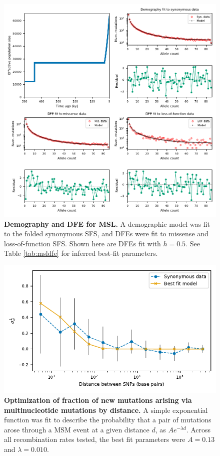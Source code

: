 \documentclass[]{article}
\begin{document}
\begin{figure}[ht!]
    \centering
    \includegraphics{../figures/msl_demography_dfes}
    \caption{
        \textbf{Demography and DFE for MSL.} A demographic model was fit to
        the folded synonymous SFS, and DFEs were fit to missense and loss-of-function
        SFS. Shown here are DFEs fit with \(h=0.5\). See Table \ref{tab:msldfe} for
        inferred best-fit parameters.
    }
    \label{fig:msldemogdfe}
\end{figure}

\begin{figure}[ht!]
    \centering
    \includegraphics{../figures/msl_mnms}
    \caption{
        \textbf{Optimization of fraction of new mutations arising via
        multinucleotide mutations by distance.} A simple exponential function was fit
        to describe the probability that a pair of mutations arose through a MSM event
        at a given distance \(d\), as \(Ae^{-\lambda d}\). Across all recombination rates
        tested, the best fit parameters were \(A=0.13\) and \(\lambda=0.010\).
    }
    \label{fig:mslmnms}
\end{figure}
\end{document}
